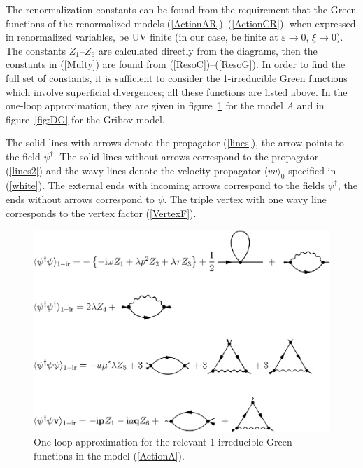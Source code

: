 \documentclass[12pt]{article}
\begin{document}
The renormalization constants can be found from the requirement that the
Green functions of the renormalized models
(\ref{ActionAR})--(\ref{ActionCR}), when expressed in renormalized
variables, be UV finite (in our case, be finite at $\varepsilon\to0$,
$\xi\to0$). The constants $Z_{1}$--$Z_{6}$ are calculated directly from
the diagrams, then the constants in (\ref{Multy}) are found from
(\ref{ResoC})--(\ref{ResoG}). In order to find the full set of constants,
it is sufficient to consider the 1-irreducible Green functions which involve
superficial divergences; all these functions are listed above.
In the one-loop approximation, they are given in figure~\ref{fig:DA} for the
model {\it A} and in figure~\ref{fig:DG} for the Gribov model.

The solid lines with arrows denote the propagator (\ref{lines}),
the arrow points to the field $\psi^{\dag}$. The solid lines without arrows
correspond to the propagator (\ref{lines2}) and the wavy lines denote the
velocity propagator $\langle vv \rangle_{0}$ specified in (\ref{white}).
The external ends with incoming arrows correspond to the fields
$\psi^{\dag}$, the ends without arrows correspond to $\psi$. The triple
vertex with one wavy line corresponds to the vertex factor (\ref{VertexF}).

\begin{figure}
\begin{center}
\includegraphics[width=15cm]{MODELA.EPS}
\caption{\label{fig:DA}
One-loop approximation for the relevant 1-irreducible Green functions
in the model (\protect\ref{ActionA}).}
\end{center}
\end{figure}
\end{document}
